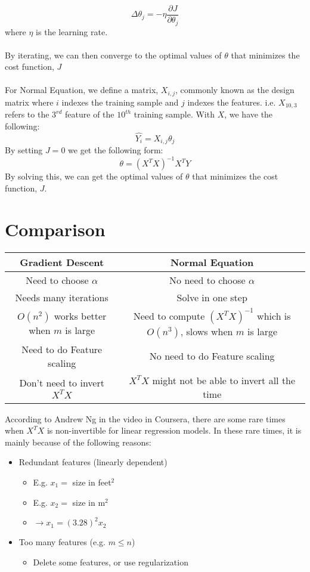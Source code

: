 \documentclass{article}
\begin{document}
\begin{equation}
	\Delta \theta_j = -\eta \frac{\partial J}{\partial \theta_j}
\end{equation}
where $\eta$ is the learning rate. \\ \\
By iterating, we can then converge to the optimal values of $\theta$ that minimizes the cost function, $J$ \\ \\
For Normal Equation, we define a matrix, $X_{i,j}$, commonly known as the design matrix where $i$ indexes the training sample and $j$ indexes the features. i.e. $X_{10,3}$ refers to the $3^{rd}$ feature of the $10^{th}$ training sample. With $X$, we have the following:
\begin{equation}
	\hat{Y_i} = X_{i,j} \theta_j
\end{equation}
By setting $J = 0$ we get the following form:
\begin{equation}
	\theta = (X^TX)^{-1}X^TY
\end{equation} 
By solving this, we can get the optimal values of $\theta$ that minimizes the cost function,  $J$.
\section{Comparison}
\begin{center}
	\begin{tabular}{ |c|c| } 
		\hline
		\textbf{Gradient Descent} & \textbf{Normal Equation} \\
		\hline 
		Need to choose $\alpha$ & No need to  choose $\alpha$ \\
		Needs many iterations & Solve in one step  \\ 
		$O(n^2)$ works better when $m$ is large & Need to compute $(X^TX)^{-1}$ which is $O(n^3)$, slows when $m$ is large \\
		Need to do Feature scaling & No need to do Feature scaling \\
		Don't need to invert $X^TX$ & $X^TX$ might not be able to invert all the time \\
		\hline
	\end{tabular}
\end{center}
According to Andrew Ng in the video in Coursera, there are some rare times when $X^TX$ is non-invertible for linear regression models. In these rare times, it is mainly because of the following reasons:
\begin{itemize}
	\item Redundant features (linearly dependent)
		\begin{itemize}
			\item E.g. $x_1 = $ size in feet$^2$
			\item E.g. $x_2 = $ size in m$^2$
			\item $\rightarrow x_1 = (3.28)^2 x_2$
		\end{itemize}
	\item Too many features (e.g. $m \le n$)
	\begin{itemize}
		\item Delete some features, or use regularization
	\end{itemize}
\end{itemize} 
\end{document}
